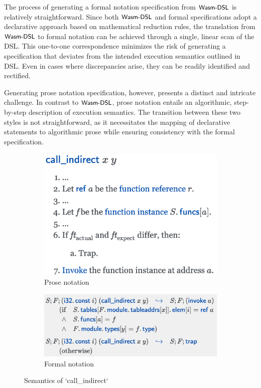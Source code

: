The process of generating a formal notation specification from $\textsf{\small Wasm-DSL}$ is
relatively straightforward. Since both $\textsf{\small Wasm-DSL}$ and formal specifications adopt
a declarative approach based on mathematical reduction rules, the translation
from $\textsf{\small Wasm-DSL}$ to formal notation can be achieved through a single, linear scan
of the DSL. This one-to-one correspondence minimizes the risk of generating a
specification that deviates from the intended execution semantics outlined in
DSL. Even in cases where discrepancies arise, they can be readily identified
and rectified.

Generating prose notation specification, however, presents a distinct and
intricate challenge. In contrast to $\textsf{\small Wasm-DSL}$, prose notation entails an
algorithmic, step-by-step description of execution semantics. The transition
between these two styles is not straightforward, as it necessitates the mapping
of declarative statements to algorithmic prose while ensuring consistency with
the formal specification.

\begin{figure}
  \centering
  \begin{subfigure}[b]{0.45\textwidth}
    \includegraphics[width=\textwidth]{img/prosespec2}
    \caption{Prose notation}
    \label{fig:prosespec2}
  \end{subfigure}
  \hfill
  \begin{subfigure}[b]{0.45\textwidth}
    \includegraphics[width=\textwidth]{img/formalspec2}
    \caption{Formal notation}
    \label{fig:formalspec2}
  \end{subfigure}

  \caption{Semantics of `call\_indirect`}
  \label{fig:spec2}
\end{figure}

